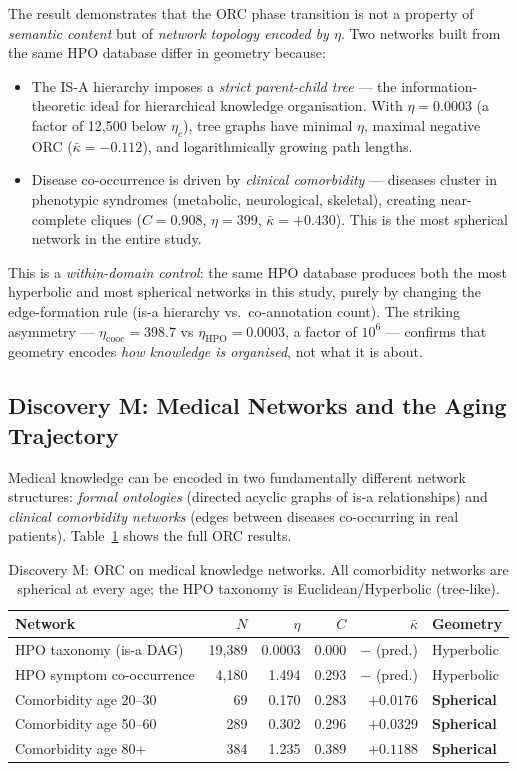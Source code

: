 \documentclass[11pt,a4paper]{article}
\newcommand{\kbar}{\bar{\kappa}}
\newcommand{\etac}{\eta_c}
\begin{document}
The result demonstrates that the ORC phase transition is not a property of \emph{semantic content} but of \emph{network topology encoded by $\eta$}. Two networks built from the same HPO database differ in geometry because:
\begin{itemize}
  \item The IS-A hierarchy imposes a \emph{strict parent-child tree} --- the information-theoretic ideal for hierarchical knowledge organisation. With $\eta = 0.0003$ (a factor of 12,500 below $\etac$), tree graphs have minimal $\eta$, maximal negative ORC ($\kbar = -0.112$), and logarithmically growing path lengths.
  \item Disease co-occurrence is driven by \emph{clinical comorbidity} --- diseases cluster in phenotypic syndromes (metabolic, neurological, skeletal), creating near-complete cliques ($C = 0.908$, $\eta = 399$, $\kbar = +0.430$). This is the most spherical network in the entire study.
\end{itemize}

This is a \emph{within-domain control}: the same HPO database produces both the most hyperbolic and most spherical networks in this study, purely by changing the edge-formation rule (is-a hierarchy vs.\ co-annotation count). The striking asymmetry --- $\eta_{\text{cooc}} = 398.7$ vs $\eta_{\text{HPO}} = 0.0003$, a factor of $10^6$ --- confirms that geometry encodes \emph{how knowledge is organised}, not what it is about.

\subsection{Discovery M: Medical Networks and the Aging Trajectory}
\label{sec:discovery_m}

Medical knowledge can be encoded in two fundamentally different network structures:
\emph{formal ontologies} (directed acyclic graphs of is-a relationships) and \emph{clinical comorbidity networks} (edges between diseases co-occurring in real patients). Table~\ref{tab:discovery_m} shows the full ORC results.

\begin{table}[h]
\centering
\caption{Discovery M: ORC on medical knowledge networks. All comorbidity networks
are spherical at every age; the HPO taxonomy is Euclidean/Hyperbolic (tree-like).}
\label{tab:discovery_m}
\begin{tabular}{lrrrrl}
\hline
Network & $N$ & $\eta$ & $C$ & $\bar{\kappa}$ & Geometry \\
\hline
HPO taxonomy (is-a DAG)    & 19,389 & 0.0003 & 0.000 & $-$ (pred.) & Hyperbolic \\
HPO symptom co-occurrence  & 4,180  & 1.494  & 0.293 & $-$ (pred.) & Hyperbolic \\
Comorbidity age 20--30     & 69     & 0.170  & 0.283 & $+0.0176$   & \textbf{Spherical} \\
Comorbidity age 50--60     & 289    & 0.302  & 0.296 & $+0.0329$   & \textbf{Spherical} \\
Comorbidity age 80+        & 384    & 1.235  & 0.389 & $+0.1188$   & \textbf{Spherical} \\
\hline
\end{tabular}
\end{table}
\end{document}
